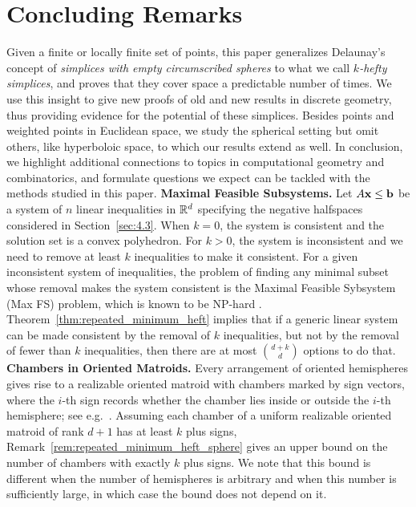 \documentclass[10pt,a4paper]{article}
\newcommand {\mm}[1] {\ifmmode{#1}\else{\mbox{\(#1\)}}\fi}
\theoremstyle{plain}
\newcommand{\Rspace}        {\mm{{\mathbb R}}}
\newcommand{\bbb}           {\mm{\bf b}}
\newcommand{\xxx}           {\mm{\bf{x}}}
\begin{document}
\section{Concluding Remarks}
\label{sec:5}
Given a finite or locally finite set of points, this paper generalizes Delaunay's concept of \emph{simplices with empty circumscribed spheres} \cite{Del34} to what we call \emph{$k$-hefty simplices}, and proves that they cover space a predictable number of times.
We use this insight to give new proofs of old and new results in discrete geometry, thus providing evidence for the potential of these simplices.
Besides points and weighted points in Euclidean space, we study the spherical setting but omit others, like hyperboloic space, to which our results extend as well.
In conclusion, we highlight additional connections to topics in computational geometry and combinatorics, and formulate  questions we expect can be tackled with the methods studied in this paper.
\medskip \noindent
\textbf{Maximal Feasible Subsystems.}
%
Let $A \xxx \leq \bbb$ be a system of $n$ linear inequalities in $\Rspace^d$ specifying the negative halfspaces considered in Section~\ref{sec:4.3}.
When $k=0$, the system is consistent and the solution set is a convex polyhedron.
For $k>0$, the system is inconsistent and we need to remove at least $k$ inequalities to make it consistent.
\smallskip
For a given inconsistent system of inequalities, the problem of finding any minimal subset whose removal makes the system consistent is the Maximal Feasible Sybsystem ({\sc Max FS}) problem, which is known to be {\sc NP}-hard \cite{AK95}.
Theorem~\ref{thm:repeated_minimum_heft} implies that if a generic linear system can be made consistent by the removal of $k$ inequalities, but not by the removal of fewer than $k$ inequalities, then there are at most $\binom{d+k}{d}$ options to do that.
\medskip \noindent
\textbf{Chambers in Oriented Matroids.}
Every arrangement of oriented hemispheres gives rise to a realizable oriented matroid with chambers marked by sign vectors, where the $i$-th sign records whether the chamber lies inside or outside the $i$-th hemisphere; see e.g.\ \cite{RGZ17}.
Assuming each chamber of a uniform realizable oriented matroid of rank $d+1$ has at least $k$ plus signs, Remark~\ref{rem:repeated_minimum_heft_sphere} gives an upper bound on the number of chambers with exactly $k$ plus signs.
We note that this bound is different when the number of hemispheres is arbitrary and when this number is sufficiently large, in which case the bound does not depend on it.
\end{document}
